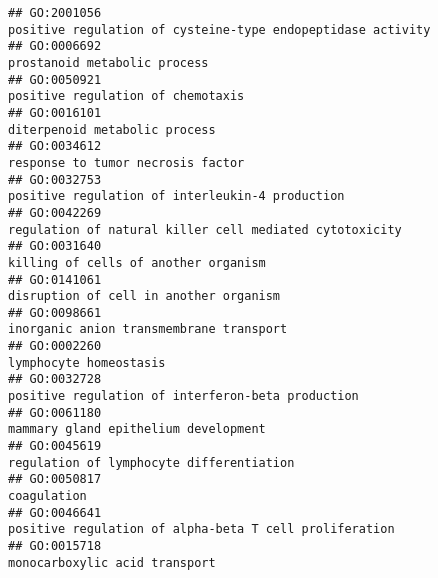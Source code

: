 \documentclass[
]{article}
\begin{document}
\begin{verbatim}
## GO:2001056                                                                                      positive regulation of cysteine-type endopeptidase activity
## GO:0006692                                                                                                                     prostanoid metabolic process
## GO:0050921                                                                                                                positive regulation of chemotaxis
## GO:0016101                                                                                                                    diterpenoid metabolic process
## GO:0034612                                                                                                                response to tumor necrosis factor
## GO:0032753                                                                                                  positive regulation of interleukin-4 production
## GO:0042269                                                                                          regulation of natural killer cell mediated cytotoxicity
## GO:0031640                                                                                                             killing of cells of another organism
## GO:0141061                                                                                                           disruption of cell in another organism
## GO:0098661                                                                                                          inorganic anion transmembrane transport
## GO:0002260                                                                                                                           lymphocyte homeostasis
## GO:0032728                                                                                                positive regulation of interferon-beta production
## GO:0061180                                                                                                             mammary gland epithelium development
## GO:0045619                                                                                                         regulation of lymphocyte differentiation
## GO:0050817                                                                                                                                      coagulation
## GO:0046641                                                                                           positive regulation of alpha-beta T cell proliferation
## GO:0015718                                                                                                                    monocarboxylic acid transport

\end{verbatim}
\end{document}
